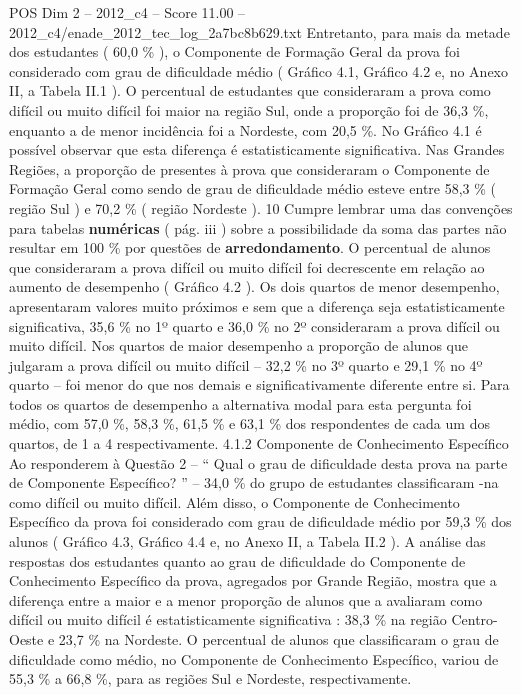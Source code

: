 \begin{textsample}{POS Dim 2 – 2012\_c4 – Score 11.00 – 2012\_c4/enade\_2012\_tec\_log\_2a7bc8b629.txt}
Entretanto, para mais da metade dos estudantes ( 60,0 \% ), o Componente de Formação Geral da prova foi considerado com grau de dificuldade médio ( Gráfico 4.1, Gráfico 4.2 e, no Anexo II, a Tabela II.1 ).
O percentual de estudantes que consideraram a prova como difícil ou muito difícil foi maior na região Sul, onde a proporção foi de 36,3 \%, enquanto a de menor incidência foi a Nordeste, com 20,5 \%.
No Gráfico 4.1 é possível observar que esta diferença é estatisticamente significativa.
Nas Grandes Regiões, a proporção de presentes à prova que consideraram o Componente de Formação Geral como sendo de grau de dificuldade médio esteve entre 58,3 \% ( região Sul ) e 70,2 \% ( região Nordeste ). 10 Cumpre lembrar uma das convenções para tabelas \textbf{numéricas} ( pág. iii ) sobre a possibilidade da soma das partes não resultar em 100 \% por questões de \textbf{arredondamento}.
O percentual de alunos que consideraram a prova difícil ou muito difícil foi decrescente em relação ao aumento de desempenho ( Gráfico 4.2 ).
Os dois quartos de menor desempenho, apresentaram valores muito próximos e sem que a diferença seja estatisticamente significativa, 35,6 \% no 1º quarto e 36,0 \% no 2º consideraram a prova difícil ou muito difícil.
Nos quartos de maior desempenho a proporção de alunos que julgaram a prova difícil ou muito difícil – 32,2 \% no 3º quarto e 29,1 \% no 4º quarto – foi menor do que nos demais e significativamente diferente entre si.
Para todos os quartos de desempenho a alternativa modal para esta pergunta foi médio, com 57,0 \%, 58,3 \%, 61,5 \% e 63,1 \% dos respondentes de cada um dos quartos, de 1 a 4 respectivamente. 4.1.2 Componente de Conhecimento Específico Ao responderem à Questão 2 – “ Qual o grau de dificuldade desta prova na parte de Componente Específico? ” – 34,0 \% do grupo de estudantes classificaram -na como difícil ou muito difícil.
Além disso, o Componente de Conhecimento Específico da prova foi considerado com grau de dificuldade médio por 59,3 \% dos alunos ( Gráfico 4.3, Gráfico 4.4 e, no Anexo II, a Tabela II.2 ).
A análise das respostas dos estudantes quanto ao grau de dificuldade do Componente de Conhecimento Específico da prova, agregados por Grande Região, mostra que a diferença entre a maior e a menor proporção de alunos que a avaliaram como difícil ou muito difícil é estatisticamente significativa : 38,3 \% na região Centro-Oeste e 23,7 \% na Nordeste.
O percentual de alunos que classificaram o grau de dificuldade como médio, no Componente de Conhecimento Específico, variou de 55,3 \% a 66,8 \%, para as regiões Sul e Nordeste, respectivamente.

\end{textsample}
